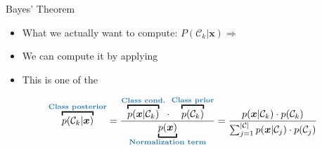 \begin{frame}{Bayes' Theorem}{}
	\begin{itemize}
		\item What we actually want to compute: $P(\mathcal{C}_k \vert \bm{x}) \Rightarrow$
		\item We can compute it by applying 
		\item This is one of the 
	\end{itemize}

	\begin{boxBlue}
		\begin{equation}
			\overbracket{p(\mathcal{C}_k \vert \bm{x})}^{\text{\highlight{Class posterior}}}
				= \frac{
					\overbracket{p(\bm{x} \vert \mathcal{C}_k)}^{\text{\highlight{Class cond.}}}
					\cdot
					\overbracket{p(\mathcal{C}_k)}^{\text{\highlight{Class prior}}}
				}{
					\underbracket{p(\bm{x})}_{\text{\highlight{Normalization term}}}
				}
				= \frac{
					p(\bm{x} \vert \mathcal{C}_k) \cdot p(\mathcal{C}_k)
				}{
					\sum_{j=1}^{\vert \mathcal{C} \vert} p(\bm{x} \vert \mathcal{C}_j) \cdot p(\mathcal{C}_j)
				}
		\end{equation}
	\end{boxBlue}
\end{frame}


